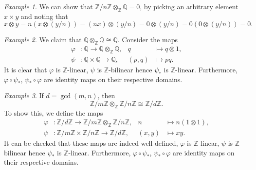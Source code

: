 \documentclass[11pt]{article}
\newcommand{\Q}{\mathbb{Q}}
\newcommand{\Z}{\mathbb{Z}}
\theoremstyle{definition}
\theoremstyle{remark}
\newtheorem*{example}{Example}
\numberwithin{equation}{section}
\begin{document}
    \begin{example}
        We can show that $\Z/n\Z \otimes_\Z \Q = 0$, by picking an arbitrary element
        $x\times y$ and noting that \[
            x\otimes y = n(x\otimes (y / n)) = (nx) \otimes (y / n) = 0\otimes (y /
            n) = 0(0\otimes (y / n)) = 0.
        \]
    \end{example}

    \begin{example}
        We claim that $\Q\otimes_\Z \Q \cong \Q$. Consider the maps \begin{align*}
            \varphi&\colon \Q \to \Q\otimes_\Z \Q, &q&\mapsto q\otimes 1, \\
            \psi&\colon \Q\times \Q \to \Q, &(p, q)&\mapsto pq.
        \end{align*}
        It is clear that $\varphi$ is $\Z$-linear, $\psi$ is $\Z$-bilinear hence
        $\psi_*$ is $\Z$-linear. Furthermore, $\varphi\circ \psi_*$, $\psi_*\circ
        \varphi$ are identity maps on their respective domains.
    \end{example}

    \begin{example}
        If $d = \gcd(m, n)$, then \[
            \Z/m\Z \otimes_\Z \Z/n\Z \cong \Z/d\Z.
        \] To show this, we define the maps \begin{align*}
            \varphi&\colon \Z/d\Z \to \Z/m\Z\otimes_\Z \Z/n\Z, &n&\mapsto n(1\otimes
            1), \\
            \psi&\colon \Z/m\Z \times \Z/n\Z \to \Z/d\Z, &(x, y)&\mapsto xy.
        \end{align*}
        It can be checked that these maps are indeed well-defined, $\varphi$ is
        $\Z$-linear, $\psi$ is $\Z$-bilinear hence $\psi_*$ is $\Z$-linear.
        Furthermore, $\varphi\circ \psi_*$, $\psi_*\circ\varphi$ are identity maps on
        their respective domains.
    \end{example}
\end{document}
